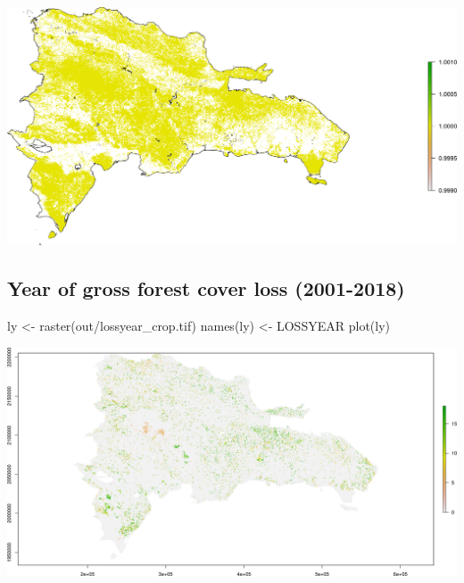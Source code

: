 \documentclass[10pt,landscape,a3paper]{article}
\newenvironment{Shaded}{\begin{snugshade}}{\end{snugshade}}
\newcommand{\FunctionTok}[1]{\textcolor[rgb]{0.00,0.00,0.00}{#1}}
\newcommand{\NormalTok}[1]{#1}
\newcommand{\OtherTok}[1]{\textcolor[rgb]{0.56,0.35,0.01}{#1}}
\newcommand{\StringTok}[1]{\textcolor[rgb]{0.31,0.60,0.02}{#1}}
\begin{document}
\begin{center}\includegraphics{img/tree-canopy-cover-2000-nationwide-2} \end{center}

\hypertarget{year-of-gross-forest-cover-loss-2001-2018}{%
\subsection{Year of gross forest cover loss
(2001-2018)}\label{year-of-gross-forest-cover-loss-2001-2018}}

\begin{Shaded}
\begin{Highlighting}[]
\NormalTok{ly }\OtherTok{\textless{}{-}} \FunctionTok{raster}\NormalTok{(}\StringTok{\textquotesingle{}out/lossyear\_crop.tif\textquotesingle{}}\NormalTok{)}
\FunctionTok{names}\NormalTok{(ly) }\OtherTok{\textless{}{-}} \StringTok{\textquotesingle{}LOSSYEAR\textquotesingle{}}
\FunctionTok{plot}\NormalTok{(ly)}
\end{Highlighting}
\end{Shaded}

\begin{center}\includegraphics{img/year-of-gross-forest-cover-loss-nationwide-1} \end{center}
\end{document}
